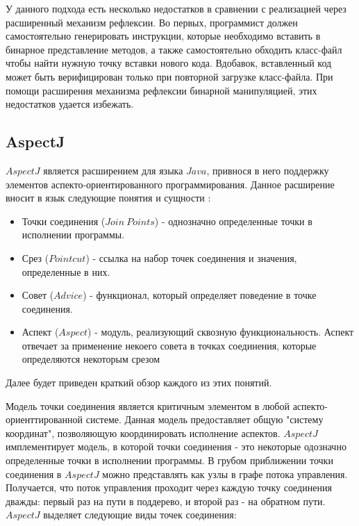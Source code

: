 У данного подхода есть несколько недостатков в сравнении с реализацией через расширенный механизм рефлексии. Во первых, программист должен самостоятельно генерировать инструкции, которые необходимо вставить в бинарное представление методов, а также самостоятельно обходить класс-файл чтобы найти нужную точку вставки нового кода. Вдобавок, вставленный код может быть верифицирован только при повторной загрузке класс-файла. При помощи расширения механизма рефлексии бинарной манипуляцией, этих недостатков удается избежать.

\subsection{AspectJ}

$AspectJ$ является расширением для языка $Java$, привнося в него поддержку элементов аспекто-ориентированного программирования. Данное расширение вносит в язык следующие понятия и сущности \cite{aspectj}:

\begin{itemize}
    \item Точки соединения ($Join~Points$) - однозначно определенные точки в исполнении программы.
    \item Срез ($Pointcut$) - ссылка на набор точек соединения и значения, определенные в них.
    \item Совет ($Advice$) - функционал, который определяет поведение в точке соединения.
    \item Аспект ($Aspect$) - модуль, реализующий сквозную функциональность. Аспект отвечает за применение некоего совета в точках соединения, которые определяются некоторым срезом
\end{itemize}

Далее будет приведен краткий обзор каждого из этих понятий.

Модель точки соединения является критичным элементом в любой аспекто-ориенттированной системе. Данная модель предоставляет общую "систему координат", позволяющую координировать исполнение аспектов. $AspectJ$ имплементирует модель, в которой точки соединения - это некоторые одозначно определенные точки в исполнении программы. В грубом приближении точки соединения в $AspectJ$ можно представлять как узлы в графе потока управления. Получается, что поток управления проходит через каждую точку соединения дважды: первый раз на пути в поддерево, и второй раз - на обратном пути. $AspectJ$ выделяет следующие виды точек соединения:

